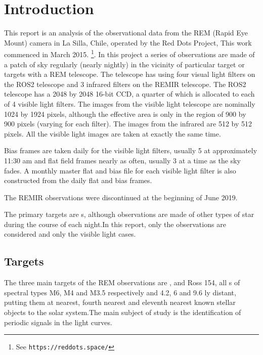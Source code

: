\section{Introduction}
\protect\label{section:intro}

\engdate

This report is an analysis of the observational data from the REM (Rapid Eye
Mount) camera in La Silla, Chile, operated by the Red Dots Project, This work
commenced in March 2015. \footnote{See \texttt{https://reddots.space/}}. In
this project a series of observations are made of a patch of sky regularly
(nearly nightly) in the vicinity of particular target or targets with a REM
telescope. The telescope has using four visual light filters on the ROS2
telescope and 3 infrared filters on the REMIR telescope. The ROS2 telescope has
a 2048 by 2048 16-bit CCD, a quarter of which is allocated to each of 4 visible
light filters. The images from the visible light telescope are nominally 1024 by
1924 pixels, although the effective area is only in the region of 900 by 900
pixels (varying for each filter). The images from the infrared are 512 by
512 pixels. All the visible light images are taken at exactly the same time.

Bias frames are taken daily for the visible light filters, usually 5 at
approximately 11:30 am and flat field frames nearly as often, usually 3 at a
time as the sky fades. A monthly master flat and bias file for each visible
light filter is also constructed from the daily flat and bias frames.

The REMIR observations were discontinued at the beginning of June 2019.

The primary targets are \rdwarf s, although observations are made of other types
of star during the course of each night.In this report, only the {\rdwarf}
observations are considered and only the visible light cases.

\subsection{Targets}

The three main targets of the REM observations are \prox, {\bstar} and Ross 154,
all \rdwarf s of spectral types M6, M4 and M3.5 respectively and 4.2, 6 and 9.6
ly distant, putting them at nearest, fourth nearest and eleventh nearest known
stellar objects to the solar system.The main subject of study is the
identification of periodic signals in the light curves.

